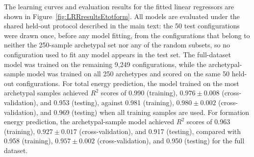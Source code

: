 \documentclass[12pt]{article}
\newcommand{\revision}[1]{{\color{red}#1}}
\begin{document}
The learning curves and evaluation results for the fitted linear regressors are shown in Figure~\ref{fig:LRRresultsEtotform}. \revision{All models are evaluated under the shared held-out protocol described in the main text: the 50 test configurations were drawn once, before any model fitting, from the configurations that belong to neither the 250-sample archetypal set nor any of the random subsets, so no configuration used to fit any model appears in the test set. The full-dataset model was trained on the remaining 9{,}249 configurations, while the archetypal-sample model was trained on all 250 archetypes and scored on the same 50 held-out configurations.} For total energy prediction, the model trained on the most archetypal samples achieved $R^2$ scores of \revision{0.990} (training), \revision{$0.976 \pm 0.008$} (cross-validation), and \revision{0.953} (testing), against \revision{0.981} (training), \revision{$0.980 \pm 0.002$} (cross-validation), and \revision{0.969} (testing) \revision{when all training samples are used}. For formation energy prediction, the archetypal-sample model achieved $R^2$ scores of \revision{0.963} (training), \revision{$0.927 \pm 0.017$} (cross-validation), and \revision{0.917} (testing), compared with 0.958 (training), $0.957 \pm 0.002$ (cross-validation), and 0.950 (testing) \revision{for the full dataset}.
\end{document}

